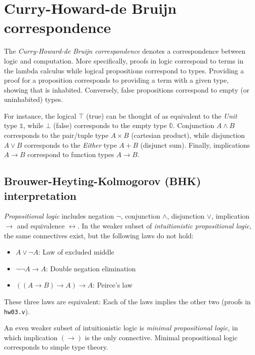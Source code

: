 \section{Curry-Howard-de Bruijn correspondence}

The \emph{Curry-Howard-de Bruĳn correspondence} denotes a correspondence between
logic and computation.
More specifically, proofs in logic correspond to terms in the lambda calculus
while logical propositions correspond to types.
Providing a proof for a proposition corresponds to providing a term
with a given type, showing that is inhabited.
Conversely, false propositions correspond to empty (or uninhabited) types.

For instance, the logical $\top$ (true) can be thought of as equivalent to the
\emph{Unit} type $\mathbb{1}$, while $\bot$ (false) corresponds to the empty type
$\mathbb{0}$.
Conjunction $A \land B$ corresponds to the pair/tuple type $A \times B$ (cartesian product), while
disjunction $A \lor B$ corresponds to the \emph{Either} type $A + B$ (disjunct sum).
Finally, implications $A \to B$ correspond to function types $A \to B$.

\subsection{Brouwer-Heyting-Kolmogorov (BHK) interpretation}
\emph{Propositional logic} includes negation $\neg$, conjunction $\land$, disjunction $\lor$, implication $\to$ and equivalence $\leftrightarrow$.
In the weaker subset of \emph{intuitionistic propositional logic}, the same connectives exist, but the following laws do not hold:
\begin{itemize}
    \item $A \lor \neg A$: Law of excluded middle
    \item $\neg \neg A \to A$: Double negation elimination
    \item $((A \to B) \to A) \to A$: Peirce's law
\end{itemize}
%
These three laws are equivalent: Each of the laws implies the other two (proofs in \texttt{hw03.v}).

An even weaker subset of intuitionistic logic is \emph{minimal propositional logic}, in which implication $(\to)$
is the only connective. Minimal propositional logic corresponds to simple type theory.

